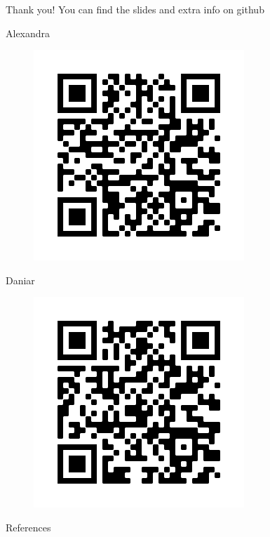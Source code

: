 \documentclass{beamer}
\begin{document}
	\begin{frame}

		Thank you! You can find the slides and extra info on github
				
		\begin{minipage}{.49\textwidth}
		\centering
		Alexandra\\
		\begin{figure}
		\includegraphics[width=.9\textwidth]{sasha-cvs}
		\end{figure}
		\end{minipage}
\hfill
		\begin{minipage}{.49\textwidth}
		\centering
		Daniar\\
		\begin{figure}
		\includegraphics[width=.9\textwidth]{daniar-cvs}
		\end{figure}
		\end{minipage}
		
	\end{frame}

	\begin{frame}[allowframebreaks]{References}
		\printbibliography[heading=none]
	\end{frame}
\end{document}
